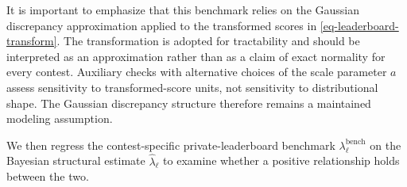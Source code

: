 \documentclass[mnsc]{informs3}
\begin{document}
It is important to emphasize that this benchmark relies on the Gaussian discrepancy approximation applied to the transformed scores in \eqref{eq-leaderboard-transform}.
The transformation is adopted for tractability and should be interpreted as an approximation rather than as a claim of exact normality for every contest. Auxiliary checks with alternative choices of the scale parameter $a$ assess sensitivity to transformed-score units, not sensitivity to distributional shape. The Gaussian discrepancy structure therefore remains a maintained modeling assumption.

We then regress the contest-specific private-leaderboard benchmark $\lambda_\ell^{\text{bench}}$ on the Bayesian structural estimate $\hat\lambda_\ell$ to examine whether a positive relationship holds between the two.
\end{document}
